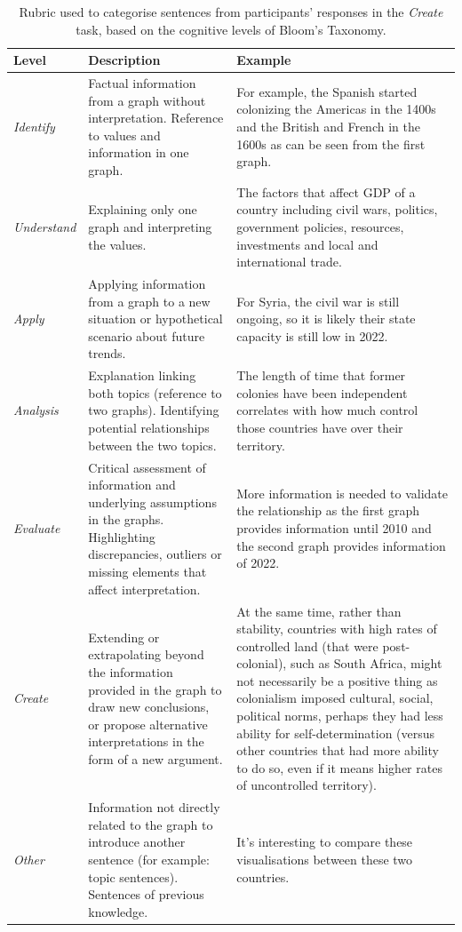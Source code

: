 \begin{table}[h]
\centering
\caption{Rubric used to categorise sentences from participants' responses in the \textit{Create} task, based on the cognitive levels of Bloom's Taxonomy. }
\small
\begin{tabular}{p{1.5cm}p{5cm}p{8cm}}
\toprule
\textbf{Level} & \textbf{Description} & \textbf{Example} \\ \midrule
\textit{Identify} & Factual information from a graph without interpretation. Reference to values and information in one graph. & For example, the Spanish started colonizing the Americas in the 1400s and the British and French in the 1600s as can be seen from the first graph. \\ \midrule
\textit{Understand} & Explaining only one graph and interpreting the values. & The factors that affect GDP of a country including civil wars, politics, government policies, resources, investments and local and international trade. \\ \midrule
\textit{Apply} & Applying information from a graph to a new situation or hypothetical scenario about future trends. & For Syria, the civil war is still ongoing, so it is likely their state capacity is still low in 2022. \\ \midrule
\textit{Analysis} & Explanation linking both topics (reference to two graphs). Identifying potential relationships between the two topics. & The length of time that former colonies have been independent correlates with how much control those countries have over their territory. \\ \midrule
\textit{Evaluate} & Critical assessment of information and underlying assumptions in the graphs. Highlighting discrepancies, outliers or missing elements that affect interpretation. & More information is needed to validate the relationship as the first graph provides information until 2010 and the second graph provides information of 2022. \\ \midrule
\textit{Create} & Extending or extrapolating beyond the information provided in the graph to draw new conclusions, or propose alternative interpretations in the form of a new argument. & At the same time, rather than stability, countries with high rates of controlled land (that were post-colonial), such as South Africa, might not necessarily be a positive thing as colonialism imposed cultural, social, political norms, perhaps they had less ability for self-determination (versus other countries that had more ability to do so, even if it means higher rates of uncontrolled territory). \\ \midrule
\textit{Other} & Information not directly related to the graph to introduce another sentence (for example: topic sentences). Sentences of previous knowledge. & It's interesting to compare these visualisations between these two countries. \\ \bottomrule
\end{tabular}
\label{tab:levels}
\end{table}